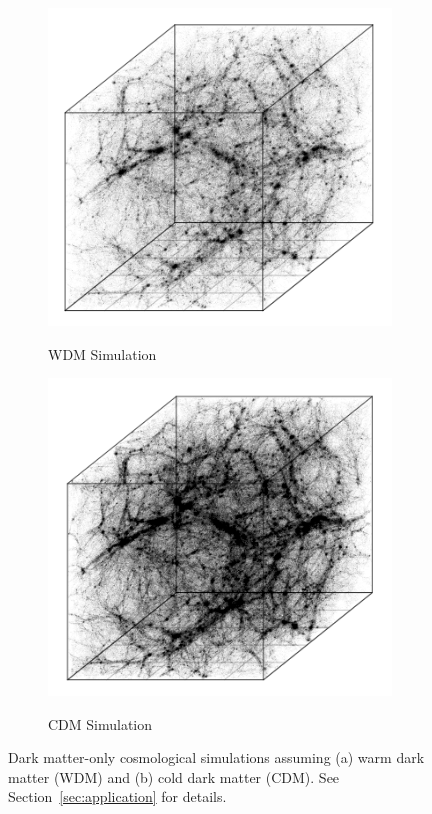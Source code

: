 \documentclass[12pt]{article}
\begin{document}
\begin{figure}[htp!]
  \centering
  \begin{subfigure}{.40\textwidth}
    \centering
    \caption{WDM Simulation}  \includegraphics[width=\linewidth]{figure_1_whole_wdm.png}
    \label{fig:introDataWDM}
  \end{subfigure}
    \begin{subfigure}{.40\textwidth}
    \centering
    \caption{CDM Simulation}  \includegraphics[width=\linewidth]{figure_1_whole_cdm.png}
    \label{fig:introDataCDM}
  \end{subfigure}
    \caption{Dark matter-only cosmological simulations assuming (a) warm dark matter (WDM) and (b) cold dark matter (CDM).  See Section~\ref{sec:application} for details. }
    \label{fig:introData}
\end{figure}
\end{document}
